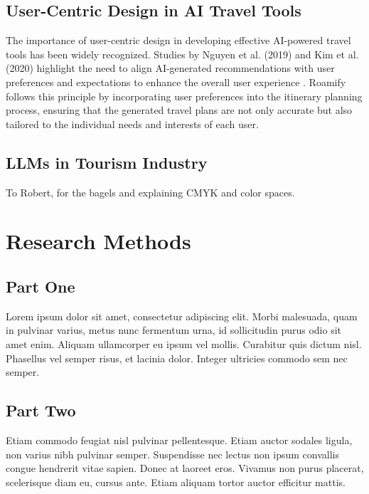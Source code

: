 \documentclass[sigconf,authordraft]{acmart}
\begin{document}
\subsection{User-Centric Design in AI Travel Tools}
The importance of user-centric design in developing effective AI-powered travel tools has been widely recognized. Studies by Nguyen et al. (2019) and Kim et al. (2020) highlight the need to align AI-generated recommendations with user preferences and expectations to enhance the overall user experience \cite{nguyen2019user, kim2020design}. Roamify follows this principle by incorporating user preferences into the itinerary planning process, ensuring that the generated travel plans are not only accurate but also tailored to the individual needs and interests of each user.

\subsection{LLMs in Tourism Industry}


\begin{acks}
To Robert, for the bagels and explaining CMYK and color spaces.
\end{acks}





\appendix

\section{Research Methods}

\subsection{Part One}

Lorem ipsum dolor sit amet, consectetur adipiscing elit. Morbi
malesuada, quam in pulvinar varius, metus nunc fermentum urna, id
sollicitudin purus odio sit amet enim. Aliquam ullamcorper eu ipsum
vel mollis. Curabitur quis dictum nisl. Phasellus vel semper risus, et
lacinia dolor. Integer ultricies commodo sem nec semper.

\subsection{Part Two}

Etiam commodo feugiat nisl pulvinar pellentesque. Etiam auctor sodales
ligula, non varius nibh pulvinar semper. Suspendisse nec lectus non
ipsum convallis congue hendrerit vitae sapien. Donec at laoreet
eros. Vivamus non purus placerat, scelerisque diam eu, cursus
ante. Etiam aliquam tortor auctor efficitur mattis.
\end{document}
